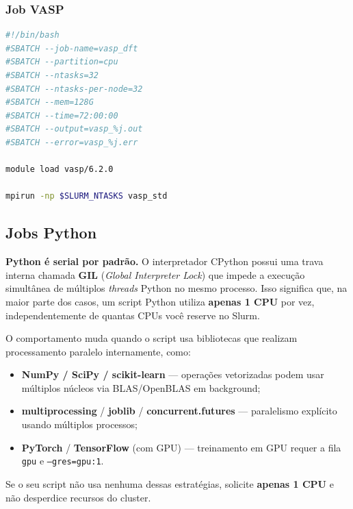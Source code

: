 \documentclass[11pt, a4paper]{article}
\begin{document}
\subsubsection{Job VASP}

\begin{lstlisting}[style=script, language=bash]
#!/bin/bash
#SBATCH --job-name=vasp_dft
#SBATCH --partition=cpu
#SBATCH --ntasks=32
#SBATCH --ntasks-per-node=32
#SBATCH --mem=128G
#SBATCH --time=72:00:00
#SBATCH --output=vasp_%j.out
#SBATCH --error=vasp_%j.err

module load vasp/6.2.0

mpirun -np $SLURM_NTASKS vasp_std
\end{lstlisting}

\subsection{Jobs Python}
\label{sec:jobs_python}

\begin{info}
  \textbf{Python é serial por padrão.} O interpretador CPython possui uma
  trava interna chamada \textbf{GIL} (\textit{Global Interpreter Lock}) que
  impede a execução simultânea de múltiplos \textit{threads} Python no mesmo
  processo. Isso significa que, na maior parte dos casos, um script Python
  utiliza \textbf{apenas 1 CPU} por vez, independentemente de quantas CPUs
  você reserve no Slurm.

  O comportamento muda quando o script usa bibliotecas que realizam
  processamento paralelo internamente, como:
  \begin{itemize}[noitemsep]
    \item \textbf{NumPy / SciPy / scikit-learn} --- operações vetorizadas
          podem usar múltiplos núcleos via BLAS/OpenBLAS em background;
    \item \textbf{multiprocessing} / \textbf{joblib} / \textbf{concurrent.futures}
          --- paralelismo explícito usando múltiplos processos;
    \item \textbf{PyTorch} / \textbf{TensorFlow} (com GPU) --- treinamento
          em GPU requer a fila \texttt{gpu} e \texttt{--gres=gpu:1}.
  \end{itemize}
  Se o seu script não usa nenhuma dessas estratégias, solicite
  \textbf{apenas 1 CPU} e não desperdice recursos do cluster.
\end{info}
\end{document}
